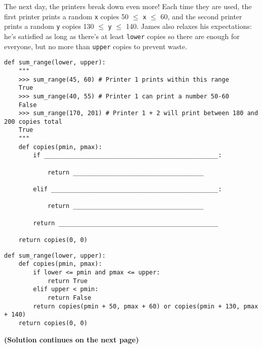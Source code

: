 \begin{blocksection}
\question The next day, the printers break down even more! Each time they are used, the first printer
prints a random \lstinline$x$ copies 50 $\leq$ \lstinline$x$ $\leq$ 60, and the second printer prints a
random \lstinline$y$ copies 130 $\leq$ \lstinline$y$ $\leq$ 140. James also relaxes his expectations: he's
satisfied as long as there's at least \lstinline$lower$ copies so there are enough for everyone, but no
more than \lstinline$upper$ copies to prevent waste. \\

\begin{lstlisting}
def sum_range(lower, upper):
    """
    >>> sum_range(45, 60) # Printer 1 prints within this range
    True
    >>> sum_range(40, 55) # Printer 1 can print a number 50-60
    False
    >>> sum_range(170, 201) # Printer 1 + 2 will print between 180 and 200 copies total
    True
    """
    def copies(pmin, pmax):
        if ________________________________________________:

            return ____________________________________

        elif ______________________________________________:

            return ____________________________________

        return ____________________________________________

    return copies(0, 0)

\end{lstlisting}

\begin{solution}[1.5in]
\begin{lstlisting}
def sum_range(lower, upper):
    def copies(pmin, pmax):
        if lower <= pmin and pmax <= upper:
            return True
        elif upper < pmin:
            return False
        return copies(pmin + 50, pmax + 60) or copies(pmin + 130, pmax + 140)
    return copies(0, 0)
\end{lstlisting}

\textbf{(Solution continues on the next page)}
\end{solution}
\end{blocksection}

